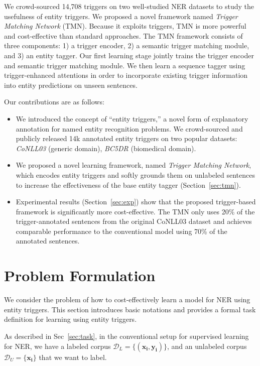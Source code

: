 We crowd-sourced 14,708 triggers on two well-studied NER datasets to study the usefulness of entity triggers. We proposed a novel framework named \textit{Trigger Matching Network} ({TMN}). Because it exploits triggers, TMN is more powerful and cost-effective than standard approaches. The TMN framework consists of three components: 1) a trigger encoder, 2) a semantic trigger matching module, and 3) an entity tagger. Our first learning stage jointly trains the trigger encoder and semantic trigger matching module. We then learn a sequence tagger using trigger-enhanced attentions in order to incorporate existing trigger information into entity predictions on unseen sentences.

Our contributions are as follows:
\begin{itemize}
    \item We introduced the concept of ``entity triggers,'' a novel form of explanatory annotation for named entity recognition problems.  We crowd-sourced and publicly released 14k annotated entity triggers on two popular datasets: \textit{CoNLL03} (generic domain), \textit{BC5DR} (biomedical domain).
    \item We proposed a novel learning framework, named \textit{Trigger Matching Network}, which encodes entity triggers and softly grounds them on unlabeled sentences to increase the effectiveness of the base entity tagger (Section~\ref{sec:tmn}). 
    \item Experimental results (Section~\ref{sec:exp}) show that the proposed trigger-based framework is significantly more cost-effective. The TMN only uses 20\% of the trigger-annotated sentences from the original CoNLL03 dataset and achieves comparable performance to the conventional model using 70\% of the annotated sentences. 
\end{itemize}





\section{Problem Formulation}
\label{sec:problem}
We consider the problem of how to cost-effectively learn a model for NER using entity triggers. This section introduces basic notations and provides a formal task definition for learning using entity triggers.

As described in Sec~\ref{sec:task}, in the conventional setup for supervised learning for NER, we have a labeled corpus $\mathcal{D}_{L}=\{(\mathbf{x_i}, \mathbf{y_i})\}$, and an unlabeled corpus $\mathcal{D}_{U}=\{\mathbf{x_i}\}$ that we want to label.

